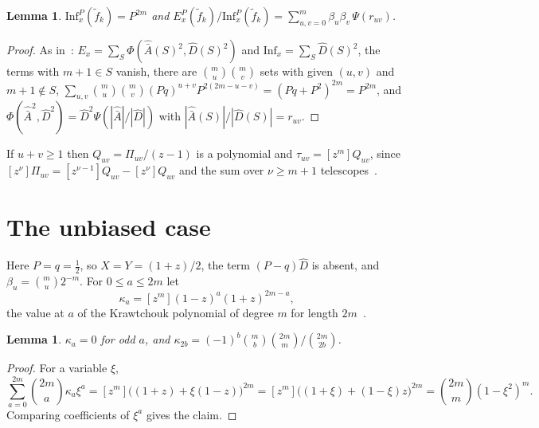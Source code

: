 \documentclass[11pt]{amsart}
\newtheorem{lemma}[theorem]{Lemma}
\theoremstyle{remark}
\newcommand{\Inf}{\mathrm{Inf}}
\begin{document}
\begin{lemma}\label{lem:sum}
$\Inf_x^P(\tilde f_k)=P^{2m}$ and $E_x^P(\tilde f_k)/\Inf_x^P(\tilde f_k)=\sum_{u,v=0}^m\beta_u\beta_v\,\Psi(r_{uv})$.
\end{lemma}

\begin{proof}
As in~\cite[Lemma~2]{Shm9}: $E_x=\sum_S\Phi(\hat{\bar A}(S)^2,\hat D(S)^2)$ and $\Inf_x=\sum_S\hat D(S)^2$, the terms
with $m+1\in S$ vanish, there are $\binom mu\binom mv$ sets with given $(u,v)$ and $m+1\notin S$,
$\sum_{u,v}\binom mu\binom mv(Pq)^{u+v}P^{2(2m-u-v)}=(Pq+P^2)^{2m}=P^{2m}$, and
$\Phi(\hat{\bar A}^2,\hat D^2)=\hat D^2\Psi(|\hat{\bar A}|/|\hat D|)$ with $|\hat{\bar A}(S)|/|\hat D(S)|=r_{uv}$.
\end{proof}

If $u+v\ge1$ then $Q_{uv}=\Pi_{uv}/(z-1)$ is a polynomial and $\tau_{uv}=[z^m]Q_{uv}$, since $[z^\nu]\Pi_{uv}=[z^{\nu-1}]Q_{uv}-[z^\nu]Q_{uv}$ and the
sum over $\nu\ge m+1$ telescopes~\cite[Lemma~3]{Shm9}.

\section{The unbiased case}\label{sec:half}

Here $P=q=\frac12$, so $X=Y=(1+z)/2$, the term $(P-q)\hat D$ is absent, and $\beta_u=\binom mu2^{-m}$. For
$0\le a\le 2m$ let
\[
\kappa_a=[z^m](1-z)^a(1+z)^{2m-a},
\]
the value at $a$ of the Krawtchouk polynomial of degree $m$ for length $2m$~\cite[Chapter~5, \S7]{MS77}.

\begin{lemma}\label{lem:kraw}
$\kappa_a=0$ for odd $a$, and $\kappa_{2b}=(-1)^b\binom mb\binom{2m}m\big/\binom{2m}{2b}$.
\end{lemma}

\begin{proof}
For a variable $\xi$,
\[
\sum_{a=0}^{2m}\binom{2m}a\kappa_a\xi^a=[z^m]\bigl((1+z)+\xi(1-z)\bigr)^{2m}=[z^m]\bigl((1+\xi)+(1-\xi)z\bigr)^{2m}
=\binom{2m}m(1-\xi^2)^m .
\]
Comparing coefficients of $\xi^a$ gives the claim.
\end{proof}
\end{document}

